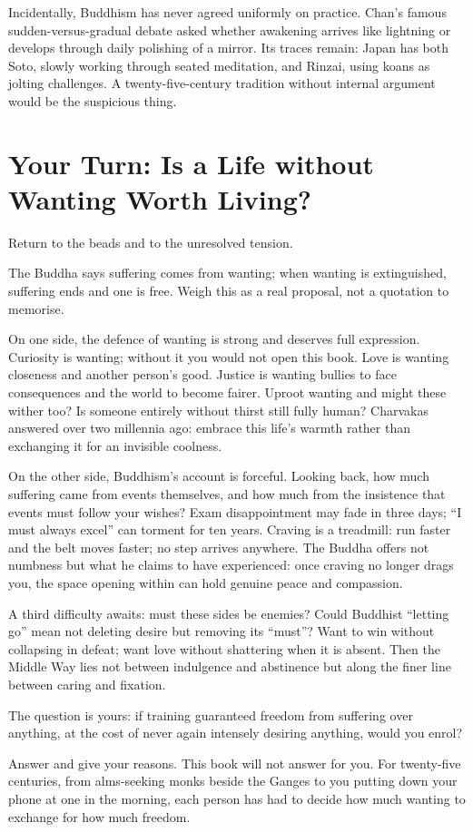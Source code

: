 Incidentally, Buddhism has never agreed uniformly on practice. Chan's famous sudden-versus-gradual debate asked whether awakening arrives like lightning or develops through daily polishing of a mirror. Its traces remain: Japan has both Soto, slowly working through seated meditation, and Rinzai, using koans as jolting challenges. A twenty-five-century tradition without internal argument would be the suspicious thing.

\section[Your Turn: Is Life without Wanting Worth It?]{Your Turn: Is a Life without Wanting Worth Living?}
Return to the beads and to the unresolved tension.

The Buddha says suffering comes from wanting; when wanting is extinguished, suffering ends and one is free. Weigh this as a real proposal, not a quotation to memorise.

On one side, the defence of wanting is strong and deserves full expression. Curiosity is wanting; without it you would not open this book. Love is wanting closeness and another person's good. Justice is wanting bullies to face consequences and the world to become fairer. Uproot wanting and might these wither too? Is someone entirely without thirst still fully human? Charvakas answered over two millennia ago: embrace this life's warmth rather than exchanging it for an invisible coolness.

On the other side, Buddhism's account is forceful. Looking back, how much suffering came from events themselves, and how much from the insistence that events must follow your wishes? Exam disappointment may fade in three days; ``I must always excel'' can torment for ten years. Craving is a treadmill: run faster and the belt moves faster; no step arrives anywhere. The Buddha offers not numbness but what he claims to have experienced: once craving no longer drags you, the space opening within can hold genuine peace and compassion.

A third difficulty awaits: must these sides be enemies? Could Buddhist ``letting go'' mean not deleting desire but removing its ``must''? Want to win without collapsing in defeat; want love without shattering when it is absent. Then the Middle Way lies not between indulgence and abstinence but along the finer line between caring and fixation.

The question is yours: if training guaranteed freedom from suffering over anything, at the cost of never again intensely desiring anything, would you enrol?

Answer and give your reasons. This book will not answer for you. For twenty-five centuries, from alms-seeking monks beside the Ganges to you putting down your phone at one in the morning, each person has had to decide how much wanting to exchange for how much freedom.
